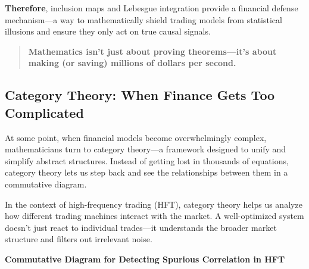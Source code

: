 \textbf{Therefore}, inclusion maps and Lebesgue integration provide a financial defense mechanism—a way to mathematically shield trading models from statistical illusions and ensure they only act on true causal signals.

\begin{quote}
\textbf{Mathematics isn’t just about proving theorems—it’s about making (or saving) millions of dollars per second.}
\end{quote}

\subsection{Category Theory: When Finance Gets Too Complicated}

At some point, when financial models become overwhelmingly complex, mathematicians turn to category theory—a framework designed to unify and simplify abstract structures. Instead of getting lost in thousands of equations, category theory lets us step back and see the relationships between them in a commutative diagram.

In the context of high-frequency trading (HFT), category theory helps us analyze how different trading machines interact with the market. A well-optimized system doesn’t just react to individual trades—it understands the broader market structure and filters out irrelevant noise.

\begin{center}
    \textbf{Commutative Diagram for Detecting Spurious Correlation in HFT}
\end{center}

